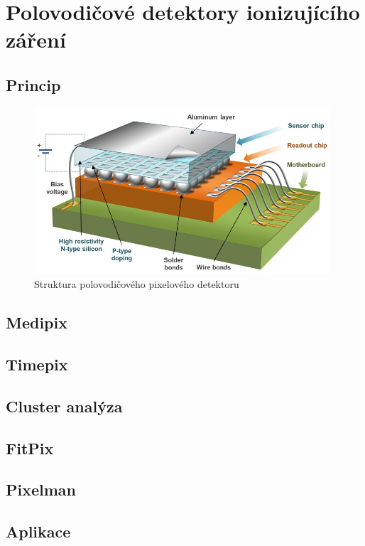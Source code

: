 

\chapter{Polovodičové detektory ionizujícího záření}\label{det}

\section{Princip}

\begin{figure}[th]
	\begin{center}
		\includegraphics[width=11cm]{figures/det_chip.png}
		\caption{Struktura polovodičového pixelového detektoru}
		\label{fig:det:chip}
	\end{center}
\end{figure}

\clearpage

\section{Medipix}\label{det:med}
\section{Timepix}\label{det:tim}
\section{Cluster analýza}\label{det:ca}
\section{FitPix}\label{det:fitpix}
\section{Pixelman}\label{det:pixelman}
\section{Aplikace}